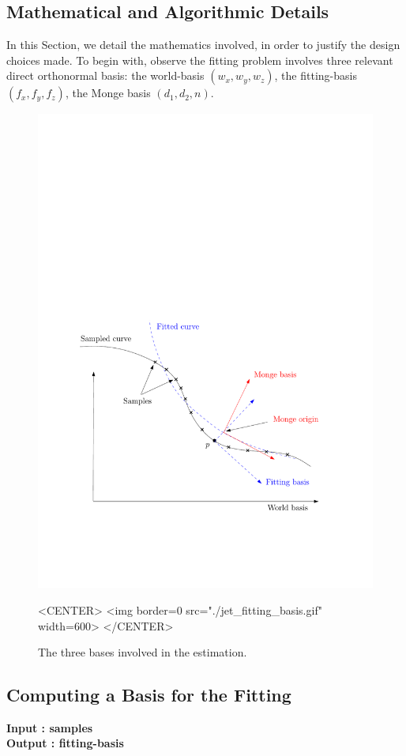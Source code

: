  \begin{ccAdvanced} 
\section{Mathematical and Algorithmic Details}
\label{sec:details}
In this Section, we detail the mathematics involved, in order to
justify the design choices made.
To begin with, observe the fitting problem involves three relevant
direct orthonormal basis: the world-basis $(w_x,w_y,w_z)$, the
fitting-basis $(f_x,f_y,f_z)$, the Monge basis $(d_1,d_2,n)$.

\begin{figure}[!ht]
\begin{ccTexOnly}
\centerline{
\includegraphics[width=.5\linewidth]{Jet_fitting_3/jet_fitting_basis}}
\end{ccTexOnly}

\label{fig:jet_fitting_basis}
\caption{The three bases involved in the estimation.}

\begin{ccHtmlOnly}
<CENTER>
<img border=0 src="./jet_fitting_basis.gif" width=600>
</CENTER>
\end{ccHtmlOnly}
\end{figure}

\subsection{Computing a Basis for the Fitting}

{\bf Input : samples\\ Output : fitting-basis}



\end{ccAdvanced}
